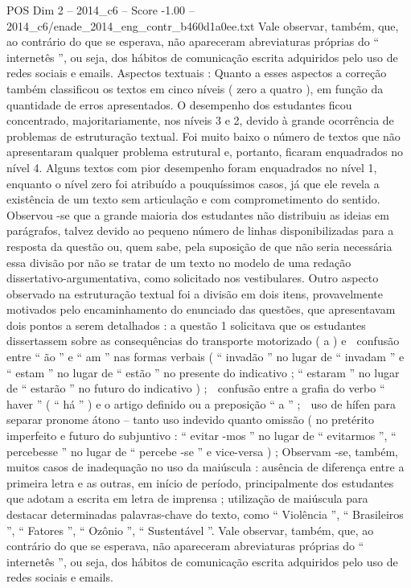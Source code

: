 \begin{textsample}{POS Dim 2 – 2014\_c6 – Score -1.00 – 2014\_c6/enade\_2014\_eng\_contr\_b460d1a0ee.txt}
Vale observar, também, que, ao contrário do que se esperava, não apareceram abreviaturas próprias do “ internetês ”, ou seja, dos hábitos de comunicação escrita adquiridos pelo uso de redes sociais e emails.
Aspectos textuais : Quanto a esses aspectos a correção também classificou os textos em cinco níveis ( zero a quatro ), em função da quantidade de erros apresentados.
O desempenho dos estudantes ficou concentrado, majoritariamente, nos níveis 3 e 2, devido à grande ocorrência de problemas de estruturação textual.
Foi muito baixo o número de textos que não apresentaram qualquer problema estrutural e, portanto, ficaram enquadrados no nível 4.
Alguns textos com pior desempenho foram enquadrados no nível 1, enquanto o nível zero foi atribuído a pouquíssimos casos, já que ele revela a existência de um texto sem articulação e com comprometimento do sentido.
Observou -se que a grande maioria dos estudantes não distribuiu as ideias em parágrafos, talvez devido ao pequeno número de linhas disponibilizadas para a resposta da questão ou, quem sabe, pela suposição de que não seria necessária essa divisão por não se tratar de um texto no modelo de uma redação dissertativo-argumentativa, como solicitado nos vestibulares.
Outro aspecto observado na estruturação textual foi a divisão em dois itens, provavelmente motivados pelo encaminhamento do enunciado das questões, que apresentavam dois pontos a serem detalhados : a questão 1 solicitava que os estudantes dissertassem sobre as consequências do transporte motorizado ( a ) e  confusão entre “ ão ” e “ am ” nas formas verbais ( “ invadão ” no lugar de “ invadam ” e “ estam ” no lugar de “ estão ” no presente do indicativo ; “ estaram ” no lugar de “ estarão ” no futuro do indicativo ) ;  confusão entre a grafia do verbo “ haver ” ( “ há ” ) e o artigo definido ou a preposição “ a ” ;  uso de hífen para separar pronome átono – tanto uso indevido quanto omissão ( no pretérito imperfeito e futuro do subjuntivo : “ evitar -mos ” no lugar de “ evitarmos ”, “ percebesse ” no lugar de “ percebe -se ” e vice-versa ) ; Observam -se, também, muitos casos de inadequação no uso da maiúscula : ausência de diferença entre a primeira letra e as outras, em início de período, principalmente dos estudantes que adotam a escrita em letra de imprensa ; utilização de maiúscula para destacar determinadas palavras-chave do texto, como “ Violência ”, “ Brasileiros ”, “ Fatores ”, “ Ozônio ”, “ Sustentável ”.
Vale observar, também, que, ao contrário do que se esperava, não apareceram abreviaturas próprias do “ internetês ”, ou seja, dos hábitos de comunicação escrita adquiridos pelo uso de redes sociais e emails.

\end{textsample}
